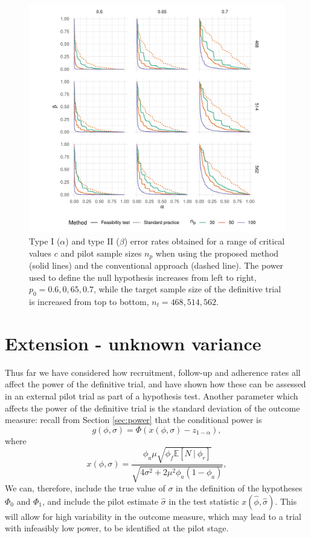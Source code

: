 \documentclass[AMA,STIX1COL]{WileyNJD-v2}
\begin{document}
\begin{figure}
\centering
\includegraphics[scale=0.8, trim={1.5cm 0 0 0},clip]{./Figures/eval.pdf}
\caption{Type I ($\alpha$) and type II ($\beta$) error rates obtained for a range of critical values $c$ and pilot sample sizes $n_p$ when using the proposed method (solid lines) and the conventional approach (dashed line). The power used to define the null hypothesis increases from left to right, $p_0 = 0.6, 0,65, 0.7$, while the target sample size of the definitive trial is increased from top to bottom, $n_t = 468, 514, 562$.}
\label{fig:eval}
\end{figure}

\section{Extension - unknown variance}\label{sec:extension}

Thus far we have considered how recruitment, follow-up and adherence rates all affect the power of the definitive trial, and have shown how these can be assessed in an external pilot trial as part of a hypothesis test. Another parameter which affects the power of the definitive trial is the standard deviation of the outcome measure: recall from Section \ref{sec:power} that the conditional power is 
$$
g(\phi, \sigma) = \Phi \left( x(\phi, \sigma) - z_{1-\alpha} \right),
$$
where
$$
x(\phi, \sigma) =  \frac{ \phi_a\mu \sqrt{\phi_f \mathbb{E}[N ~|~ \phi_r]} } {\sqrt{4\sigma^2 + 2 \mu^2 \phi_a(1-\phi_a)}},
$$
We can, therefore, include the true value of $\sigma$ in the definition of the hypotheses $\Phi_0$ and $\Phi_1$, and include the pilot estimate $\hat{\sigma}$ in the test statistic $x(\hat{\phi}, \hat{\sigma})$. This will allow for high variability in the outcome measure, which may lead to a trial with infeasibly low power, to be identified at the pilot stage.
\end{document}
